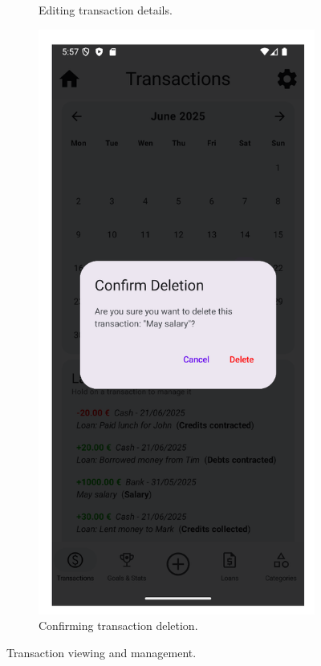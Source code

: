 \documentclass[a4paper,12pt]{article}
\begin{document}
\begin{figure}[H]
\begin{subfigure}[b]{0.23\textwidth}
        \caption{Editing transaction details.}
        \label{fig:transaction_edit_form}
    \end{subfigure}
    \par\bigskip %
    \begin{subfigure}[b]{0.23\textwidth}
        \includegraphics[width=\textwidth]{transactions_delete_dialog.png}
        \caption{Confirming transaction deletion.}
        \label{fig:transaction_delete_confirm}
    \end{subfigure}
    \caption{Transaction viewing and management.}
    \label{fig:transaction_management}
\end{figure}
\vspace{1cm}
\end{document}
